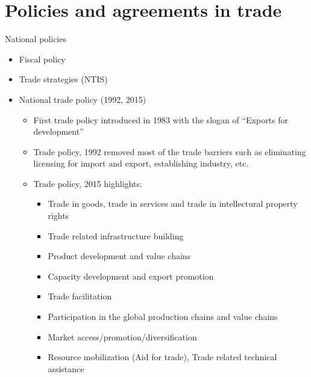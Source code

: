 \documentclass[12pt,ignorenonframetext,aspectratio=169]{beamer}
\providecommand{\tightlist}{%
  \setlength{\itemsep}{0pt}\setlength{\parskip}{0pt}}
\begin{document}
\hypertarget{policies-and-agreements-in-trade}{%
\section{Policies and agreements in
trade}\label{policies-and-agreements-in-trade}}

\begin{frame}{National policies}
\protect\hypertarget{national-policies}{}
\begin{itemize}
\tightlist
\item
  Fiscal policy
\item
  Trade strategies (NTIS)
\item
  National trade policy (1992, 2015)

  \begin{itemize}
  \tightlist
  \item
    First trade policy introduced in 1983 with the slogan of ``Exports
    for development''
  \item
    Trade policy, 1992 removed most of the trade barriers such as
    eliminating licensing for import and export, establishing industry,
    etc.
  \item
    Trade policy, 2015 highlights:

    \begin{itemize}
    \tightlist
    \item
      Trade in goods, trade in services and trade in intellectural
      property rights
    \item
      Trade related infrastructure building
    \item
      Product development and value chains
    \item
      Capacity development and export promotion
    \item
      Trade facilitation
    \item
      Participation in the global production chains and value chains
    \item
      Market access/promotion/diversification
    \item
      Resource mobilization (Aid for trade), Trade related technical
      assistance
    \end{itemize}
  \end{itemize}
\end{itemize}
\end{frame}
\end{document}
